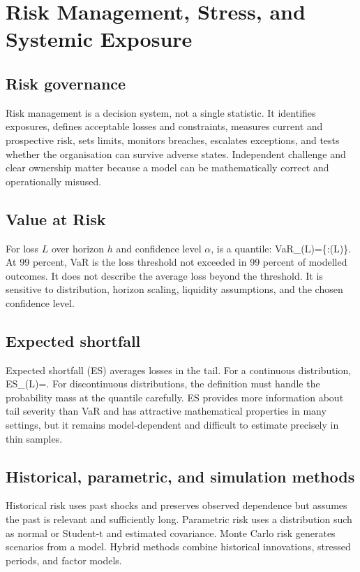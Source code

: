 \chapter{Risk Management, Stress, and Systemic Exposure}

\section{Risk governance}
Risk management is a decision system, not a single statistic. It identifies exposures, defines acceptable losses and constraints, measures current and prospective risk, sets limits, monitors breaches, escalates exceptions, and tests whether the organisation can survive adverse states. Independent challenge and clear ownership matter because a model can be mathematically correct and operationally misused.

\section{Value at Risk}
For loss $L$ over horizon $h$ and confidence level $\alpha$,  is a quantile:
  VaR_{\alpha}(L)=\inf\{\ell:\Prob(L\leq\ell)\geq\alpha\}.
\closeformula
At 99 percent, VaR is the loss threshold not exceeded in 99 percent of modelled outcomes. It does not describe the average loss beyond the threshold. It is sensitive to distribution, horizon scaling, liquidity assumptions, and the chosen confidence level.

\section{Expected shortfall}
Expected shortfall (ES) averages losses in the tail. For a continuous distribution,
  ES_{\alpha}(L)=.
\closeformula
For discontinuous distributions, the definition must handle the probability mass at the quantile carefully. ES provides more information about tail severity than VaR and has attractive mathematical properties in many settings, but it remains model-dependent and difficult to estimate precisely in thin samples.

\section{Historical, parametric, and simulation methods}
Historical risk uses past shocks and preserves observed dependence but assumes the past is relevant and sufficiently long. Parametric risk uses a distribution such as normal or Student-t and estimated covariance. Monte Carlo risk generates scenarios from a model. Hybrid methods combine historical innovations, stressed periods, and factor models.

